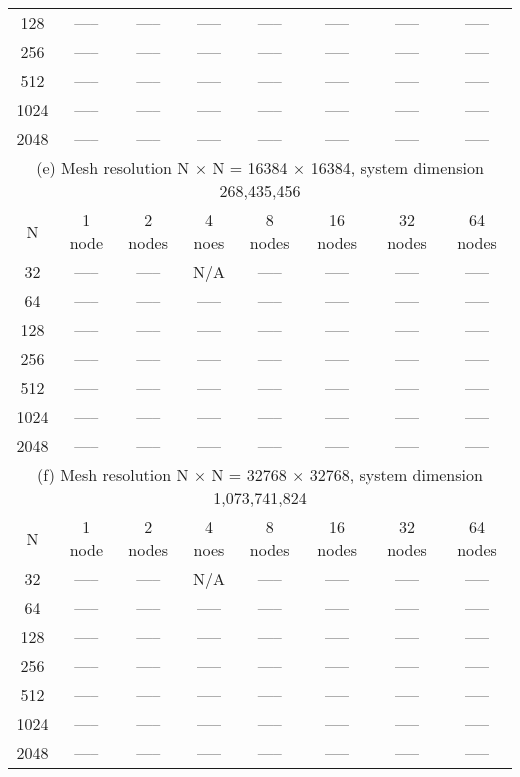 \documentclass[11pt]{article}
\begin{document}
\begin{table}[!htbp]
{\begin{tabular}{ |c|c|c|c|c|c|c|c|  }
128  & ----- & ----- & ----- & ----- & ----- & ----- & ----- \\
256  & ----- & ----- & ----- & ----- & ----- & ----- & ----- \\
512  & ----- & ----- & ----- & ----- & ----- & ----- & ----- \\
1024 & ----- & ----- & ----- & ----- & ----- & ----- & ----- \\
2048 & ----- & ----- & ----- & ----- & ----- & ----- & ----- \\
\hline
\hline
\multicolumn{8}{|c|}{(e) Mesh resolution N $\times$ N = 16384 $\times$ 16384, system dimension 268,435,456}\\
\hline
N & 1 node & 2 nodes & 4 noes & 8 nodes & 16 nodes & 32 nodes & 64 nodes \\
\hline
32   & ----- & ----- & N/A   & ----- & ----- & ----- & ----- \\
64   & ----- & ----- & ----- & ----- & ----- & ----- & ----- \\
128  & ----- & ----- & ----- & ----- & ----- & ----- & ----- \\
256  & ----- & ----- & ----- & ----- & ----- & ----- & ----- \\
512  & ----- & ----- & ----- & ----- & ----- & ----- & ----- \\
1024 & ----- & ----- & ----- & ----- & ----- & ----- & ----- \\
2048 & ----- & ----- & ----- & ----- & ----- & ----- & ----- \\
\hline
\hline
\multicolumn{8}{|c|}{(f) Mesh resolution N $\times$ N = 32768 $\times$ 32768, system dimension 1,073,741,824}\\
\hline
N & 1 node & 2 nodes & 4 noes & 8 nodes & 16 nodes & 32 nodes & 64 nodes \\
\hline
32   & ----- & ----- & N/A   & ----- & ----- & ----- & ----- \\
64   & ----- & ----- & ----- & ----- & ----- & ----- & ----- \\
128  & ----- & ----- & ----- & ----- & ----- & ----- & ----- \\
256  & ----- & ----- & ----- & ----- & ----- & ----- & ----- \\
512  & ----- & ----- & ----- & ----- & ----- & ----- & ----- \\
1024 & ----- & ----- & ----- & ----- & ----- & ----- & ----- \\
2048 & ----- & ----- & ----- & ----- & ----- & ----- & ----- \\
\hline
\end{tabular}
}
\end{table}
\end{document}
